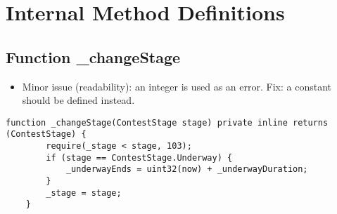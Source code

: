 \section{Internal Method Definitions}


\subsection{Function \_{}changeStage}

\begin{itemize}
\item Minor issue (readability): an integer is used as an error. Fix:
  a constant should be defined instead.
\end{itemize}

\begin{lstlisting}[firstnumber=106]
    function _changeStage(ContestStage stage) private inline returns (ContestStage) {
        require(_stage < stage, 103);
        if (stage == ContestStage.Underway) {
            _underwayEnds = uint32(now) + _underwayDuration;
        }
        _stage = stage;
    }
\end{lstlisting}
